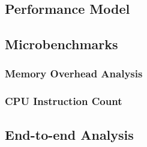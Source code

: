 \documentclass[../../main.tex]{subfiles}
\begin{document}
\subsection{Performance Model}

\subsection{Microbenchmarks}
\subsubsection{Memory Overhead Analysis}

\subsubsection{CPU Instruction Count}

\subsection{End-to-end Analysis}

\end{document}
